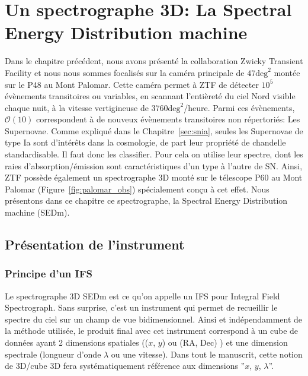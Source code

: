 \documentclass[../main/main.tex]{subfiles}
\begin{document}
\setcounter{chapter}{2}
\chapter{Un spectrographe 3D: La Spectral Energy Distribution machine}\label{ch:sedm}

\minitoc
\vspace{2cm}
Dans le chapitre précédent, nous avons présenté la collaboration Zwicky
Transient Facility et nous nous sommes focalisés sur la caméra
principale de $47\text{deg}^{2}$ montée sur le P48 au Mont
Palomar. Cette caméra permet à ZTF de détecter $10^{5}$ évènements
transitoires ou variables, en scannant l'entièreté du ciel Nord visible
chaque nuit,  à la vitesse
vertigineuse de $3760\text{deg}^{2}$/heure. Parmi ces évènements,
$\mathcal{O}(10)$ correspondent à de nouveux évènements transitoires non
répertoriés: Les Supernovae. Comme expliqué dans le
Chapitre~\ref{sec:snia}, seules les Supernovae de type Ia sont
d'intérêts dans la cosmologie, de part leur propriété de chandelle
standardisable. Il faut donc les classifier. Pour cela on utilise leur
spectre, dont les raies d'absorption/émission sont caractéristiques d'un
type à l'autre de SN. Ainsi, ZTF possède également un spectrographe 3D
monté sur le télescope P60 au Mont Palomar
(Figure~\ref{fig:palomar_obs}) spécialement conçu à cet effet. Nous
présentons dans ce chapitre ce spectrographe, la Spectral Energy
Distribution machine (SEDm).
\newpage

\section{Présentation de l'instrument}
\label{sec:ifs}

\subsection{Principe d'un IFS}
Le spectrographe 3D SEDm est ce qu'on appelle un IFS pour Integral Field
Spectrograph. Sans surprise, c'est un instrument qui permet de
recueillir le spectre du ciel sur un champ de vue bidimensionnel.
Ainsi et indépendamment de la méthode utilisée, le produit final avec
cet instrument correspond à
un cube de données ayant 2 dimensions spatiales (($x$, $y$) ou (RA,
Dec) ) et une dimension spectrale (longueur d'onde $\lambda$ ou une
vitesse). Dans tout le manuscrit, cette notion de 3D/cube 3D fera
systématiquement référence aux dimensions ''$x$, $y$, $\lambda$''.
\end{document}
